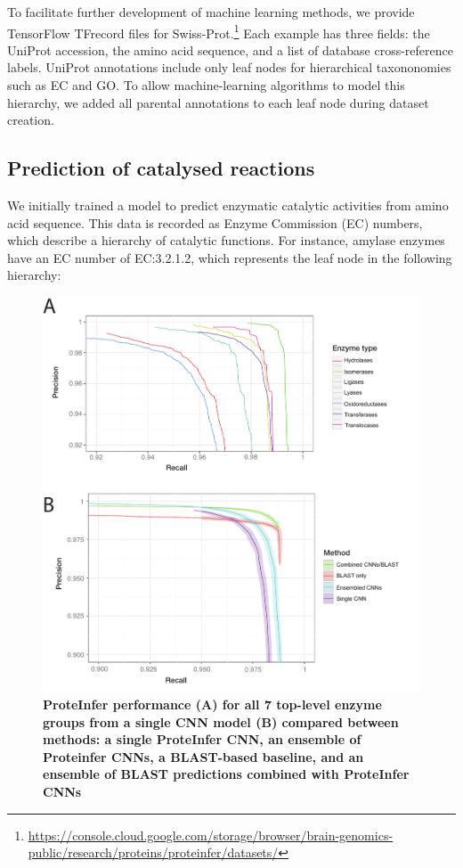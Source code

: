 To facilitate further development of machine learning methods, we provide TensorFlow \citep{abadi2016tensorflow} TFrecord files for Swiss-Prot.\footnote{\url{https://console.cloud.google.com/storage/browser/brain-genomics-public/research/proteins/proteinfer/datasets/}} Each example has three fields: the UniProt accession, the amino acid sequence, and a list of database cross-reference labels. UniProt annotations include only leaf nodes for hierarchical taxononomies such as EC and GO. To allow machine-learning algorithms to model this hierarchy, we added all parental annotations to each leaf node during dataset creation. 

\subsection*{Prediction of catalysed reactions}
We initially trained a model to predict enzymatic catalytic activities from amino acid sequence. This data is recorded as Enzyme Commission (EC) numbers, which describe a hierarchy of catalytic functions. For instance, \textbeta{} amylase enzymes have an EC number of EC:3.2.1.2, which represents the leaf node in the following hierarchy:
\renewcommand\DTstyle{\rmfamily}
\setlength{\DTbaselineskip}{15pt}
\medskip
{}
\medskip
\begin{figure}
\centering
  \includegraphics[width=\columnwidth]{fig3}%
  \caption{\textbf{ProteInfer performance (A) for all 7 top-level enzyme groups from a single CNN model (B) compared between methods: a single ProteInfer CNN, an ensemble of Proteinfer CNNs, a BLAST-based baseline, and an ensemble of BLAST predictions combined with ProteInfer CNNs }}
  \label{fig:toplevel}
\end{figure}

